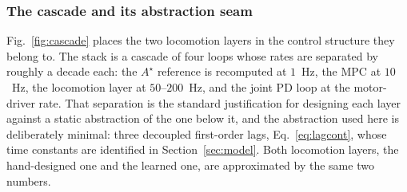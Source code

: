 \documentclass[11pt,a4paper]{article}
\newcommand{\astar}{$A^\star$}
\begin{document}

\subsubsection{The cascade and its abstraction seam}
\label{sec:cascade}

Fig.~\ref{fig:cascade} places the two locomotion layers in the control structure they belong to. The stack is
a cascade of four loops whose rates are separated by roughly a decade each: the \astar{} reference is
recomputed at $1$~Hz, the MPC at $10$~Hz, the locomotion layer at $50$--$200$~Hz, and the joint PD loop at the
motor-driver rate. That separation is the standard justification for designing each layer against a static
abstraction of the one below it, and the abstraction used here is deliberately minimal: three decoupled
first-order lags, Eq.~\eqref{eq:lagcont}, whose time constants are identified in Section~\ref{sec:model}. Both
locomotion layers, the hand-designed one and the learned one, are approximated by the same two numbers.

\end{document}
